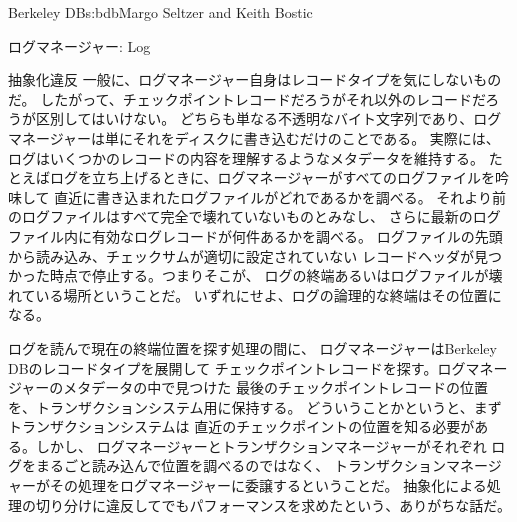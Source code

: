 \begin{aosachapter}{Berkeley DB}{s:bdb}{Margo Seltzer and Keith Bostic}
\begin{aosasect1}{ログマネージャー: Log}
\begin{aosasect2}{抽象化違反}
一般に、ログマネージャー自身はレコードタイプを気にしないものだ。
したがって、チェックポイントレコードだろうがそれ以外のレコードだろうが区別してはいけない。
どちらも単なる不透明なバイト文字列であり、ログマネージャーは単にそれをディスクに書き込むだけのことである。
実際には、ログはいくつかのレコードの内容を理解するようなメタデータを維持する。
たとえばログを立ち上げるときに、ログマネージャーがすべてのログファイルを吟味して
直近に書き込まれたログファイルがどれであるかを調べる。
それより前のログファイルはすべて完全で壊れていないものとみなし、
さらに最新のログファイル内に有効なログレコードが何件あるかを調べる。
ログファイルの先頭から読み込み、チェックサムが適切に設定されていない
レコードヘッダが見つかった時点で停止する。つまりそこが、
ログの終端あるいはログファイルが壊れている場所ということだ。
いずれにせよ、ログの論理的な終端はその位置になる。

ログを読んで現在の終端位置を探す処理の間に、
ログマネージャーはBerkeley DBのレコードタイプを展開して
チェックポイントレコードを探す。ログマネージャーのメタデータの中で見つけた
最後のチェックポイントレコードの位置を、トランザクションシステム用に保持する。
どういうことかというと、まずトランザクションシステムは
直近のチェックポイントの位置を知る必要がある。しかし、
ログマネージャーとトランザクションマネージャーがそれぞれ
ログをまるごと読み込んで位置を調べるのではなく、
トランザクションマネージャーがその処理をログマネージャーに委譲するということだ。
抽象化による処理の切り分けに違反してでもパフォーマンスを求めたという、ありがちな話だ。


\end{aosasect2}
\end{aosasect1}
\end{aosachapter}
